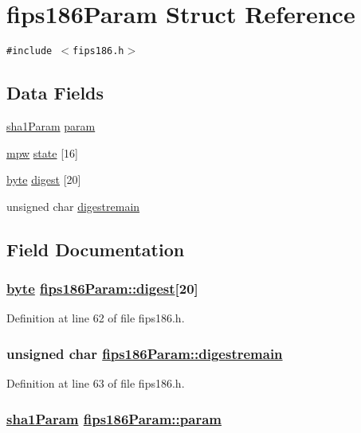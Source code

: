 \hypertarget{structfips186Param}{
\section{fips186Param Struct Reference}
\label{structfips186Param}
}
{\tt \#include $<$fips186.h$>$}

\subsection*{Data Fields}
\begin{CompactItemize}
\item 
\hyperlink{structsha1Param}{sha1Param} \hyperlink{structfips186Param_o0}{param}
\item 
\hyperlink{beecrypt_8api_8h_a9}{mpw} \hyperlink{structfips186Param_o1}{state} \mbox{[}16\mbox{]}
\item 
\hyperlink{beecrypt_8api_8h_a3}{byte} \hyperlink{structfips186Param_o2}{digest} \mbox{[}20\mbox{]}
\item 
unsigned char \hyperlink{structfips186Param_o3}{digestremain}
\end{CompactItemize}


\subsection{Field Documentation}
\hypertarget{structfips186Param_o2}{
\subsubsection[digest]{\setlength{\rightskip}{0pt plus 5cm}\hyperlink{beecrypt_8api_8h_a3}{byte} \hyperlink{structfips186Param_o2}{fips186Param::digest}\mbox{[}20\mbox{]}}}
\label{structfips186Param_o2}


Definition at line 62 of file fips186.h.\hypertarget{structfips186Param_o3}{
\subsubsection[digestremain]{\setlength{\rightskip}{0pt plus 5cm}unsigned char \hyperlink{structfips186Param_o3}{fips186Param::digestremain}}}
\label{structfips186Param_o3}


Definition at line 63 of file fips186.h.\hypertarget{structfips186Param_o0}{
\subsubsection[param]{\setlength{\rightskip}{0pt plus 5cm}\hyperlink{structsha1Param}{sha1Param} \hyperlink{structfips186Param_o0}{fips186Param::param}}}
\label{structfips186Param_o0}



